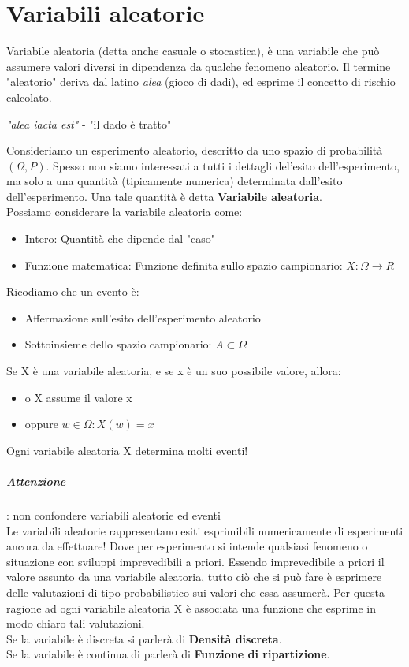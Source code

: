 \documentclass[12pt, a4paper, openany]{book}
\begin{document}
\chapter{Variabili aleatorie}
Variabile aleatoria (detta anche casuale o stocastica), è una variabile che può assumere valori
diversi in dipendenza da qualche fenomeno aleatorio. Il termine "aleatorio" deriva dal latino \textit{alea} (gioco di dadi), ed esprime il
concetto di rischio calcolato.
\begin{center}
    \textit{"alea iacta est"} - "il dado è tratto"
\end{center}

Consideriamo un esperimento aleatorio, descritto da uno spazio di probabilità $(\Omega, P)$.
Spesso non siamo interessati a tutti i dettagli del'esito dell'esperimento, ma solo a 
una quantità (tipicamente numerica) determinata dall'esito dell'esperimento.
Una tale quantità è detta \textbf{Variabile aleatoria}.
\\ Possiamo considerare la variabile aleatoria come:
\begin{itemize}
    \item Intero: Quantità che dipende dal "caso"
    \item Funzione matematica: Funzione definita sullo spazio campionario: $X: \Omega \to R$
\end{itemize}
Ricodiamo che un evento è:
\begin{itemize}
    \item Affermazione sull'esito dell'esperimento aleatorio
    \item Sottoinsieme dello spazio campionario: $A \subset \Omega$
\end{itemize}

Se X è una variabile aleatoria, e se x è un suo possibile valore, allora:
\begin{itemize}
    \item o X assume il valore x
    \item oppure ${w \in \Omega: X(w) = x }$
\end{itemize}

Ogni variabile aleatoria X determina molti eventi!
\paragraph{Attenzione}: non confondere variabili aleatorie ed eventi
\\ Le variabili aleatorie rappresentano esiti esprimibili numericamente di esperimenti
ancora da effettuare! Dove per esperimento si intende qualsiasi fenomeno o situazione con sviluppi
imprevedibili a priori. Essendo imprevedibile a priori il valore assunto da una variabile
aleatoria, tutto ciò che si può fare è esprimere delle valutazioni di tipo probabilistico sui valori
che essa assumerà. Per questa ragione ad ogni variabile aleatoria X è associata una funzione che esprime
in modo chiaro tali valutazioni. 
\\Se la variabile è discreta si parlerà di \textbf{Densità discreta}.
\\Se la variabile è continua di parlerà di \textbf{Funzione di ripartizione}.
\end{document}
